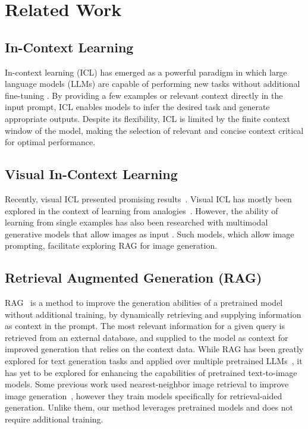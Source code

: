 \vspace{-6pt}
\section{Related Work}
\label{sec:prior_work}

\subsection{In-Context Learning}

In-context learning (ICL) has emerged as a powerful paradigm in which large language models (LLMs) are capable of performing new tasks without additional fine-tuning \cite{brown2020language}. By providing a few examples or relevant context directly in the input prompt, ICL enables models to infer the desired task and generate appropriate outputs.
Despite its flexibility, ICL is limited by the finite context window of the model, making the selection of relevant and concise context critical for optimal performance.

\vspace{-6pt}
\subsection{Visual In-Context Learning}\vspace{-2pt}

Recently, visual ICL presented promising results~\cite{gu2024analogist,wang2023context,xiao2024omnigen,najdenkoska2024context, sun2024generative}.
Visual ICL has mostly been explored in the context of learning from analogies~\cite{gu2024analogist, wang2023context, xiao2024omnigen, nguyen2024visual}.
However, the ability of learning from single examples has also been researched with multimodal generative models that allow images as input \cite{xiao2024omnigen, sun2024generative, wanggenartist}. 
Such models, which allow image prompting, facilitate exploring RAG for image generation.

\vspace{-4pt}
\subsection{Retrieval Augmented Generation (RAG)}
RAG~\cite{lewis2020retrieval} is a method to improve the generation abilities of a pretrained model without additional training, by dynamically retrieving and supplying information as context in the prompt. 
The most relevant information for a given query is retrieved from an external database, and supplied to the model as context for improved generation that relies on the context data.
While RAG has been greatly explored for text generation tasks and applied over multiple pretrained LLMs~\cite{lewis2020retrieval,gao2023retrieval,ram2023context,zhang2025aidrivensignlanguagegeneration}, it has yet to be explored for enhancing the capabilities of pretrained text-to-image models.
Some previous work used nearest-neighbor image retrieval to improve image generation~\cite{sheyninknn, blattmann2022retrieval, chenre, hu2024instruct}, however they train models specifically for retrieval-aided generation. Unlike them, our method leverages pretrained models and does not require additional training.

